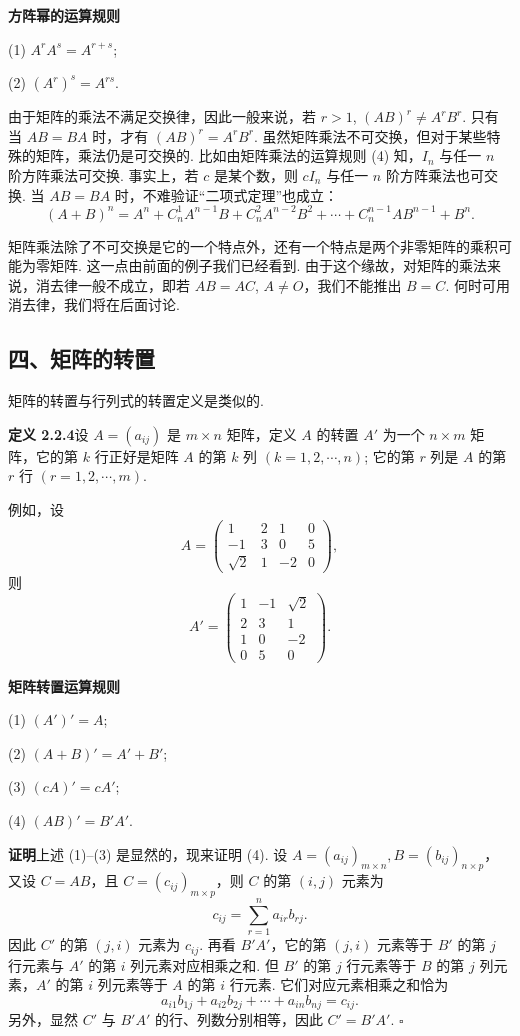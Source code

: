 \documentclass[UTF8, 12pt, fontset=fandol, oneside]{ctexart}
\begin{document}
\noindent\textbf{方阵幂的运算规则}

(1) $A^rA^s=A^{r+s}$;

(2) $(A^r)^s=A^{rs}$.

由于矩阵的乘法不满足交换律，因此一般来说，若 $r>1$, $(AB)^r\ne A^rB^r$. 只有当 $AB=BA$ 时，才有 $(AB)^r=A^rB^r$. 虽然矩阵乘法不可交换，但对于某些特殊的矩阵，乘法仍是可交换的. 比如由矩阵乘法的运算规则 (4) 知，$I_n$ 与任一 $n$ 阶方阵乘法可交换. 事实上，若 $c$ 是某个数，则 $cI_n$ 与任一 $n$ 阶方阵乘法也可交换. 当 $AB=BA$ 时，不难验证``二项式定理''也成立：
\[
(A+B)^n=A^n+C_n^1A^{n-1}B+C_n^2A^{n-2}B^2+\cdots+C_n^{n-1}AB^{n-1}+B^n.
\]

矩阵乘法除了不可交换是它的一个特点外，还有一个特点是两个非零矩阵的乘积可能为零矩阵. 这一点由前面的例子我们已经看到. 由于这个缘故，对矩阵的乘法来说，消去律一般不成立，即若 $AB=AC$, $A\ne O$，我们不能推出 $B=C$. 何时可用消去律，我们将在后面讨论.

\subsection*{四、矩阵的转置}

矩阵的转置与行列式的转置定义是类似的.

\noindent\textbf{定义 2.2.4}\quad 设 $A=(a_{ij})$ 是 $m\times n$ 矩阵，定义 $A$ 的转置 $A'$ 为一个 $n\times m$ 矩阵，它的第 $k$ 行正好是矩阵 $A$ 的第 $k$ 列 $(k=1,2,\cdots,n)$; 它的第 $r$ 列是 $A$ 的第 $r$ 行 $(r=1,2,\cdots,m)$.

例如，设
\[
A=\left(\begin{array}{cccc}
1 & 2 & 1 & 0\\
-1 & 3 & 0 & 5\\
\sqrt{2} & 1 & -2 & 0
\end{array}\right),
\]
则
\[
A'=\left(\begin{array}{ccc}
1 & -1 & \sqrt{2}\\
2 & 3 & 1\\
1 & 0 & -2\\
0 & 5 & 0
\end{array}\right).
\]

\noindent\textbf{矩阵转置运算规则}

(1) $(A')'=A$;

(2) $(A+B)'=A'+B'$;

(3) $(cA)'=cA'$;

(4) $(AB)'=B'A'$.

\noindent\textbf{证明}\quad 上述 (1)--(3) 是显然的，现来证明 (4). 设 $A=(a_{ij})_{m\times n}, B=(b_{ij})_{n\times p}$，又设 $C=AB$，且 $C=(c_{ij})_{m\times p}$，则 $C$ 的第 $(i,j)$ 元素为
\[
c_{ij}=\sum_{r=1}^{n}a_{ir}b_{rj}.
\]
因此 $C'$ 的第 $(j,i)$ 元素为 $c_{ij}$. 再看 $B'A'$，它的第 $(j,i)$ 元素等于 $B'$ 的第 $j$ 行元素与 $A'$ 的第 $i$ 列元素对应相乘之和. 但 $B'$ 的第 $j$ 行元素等于 $B$ 的第 $j$ 列元素，$A'$ 的第 $i$ 列元素等于 $A$ 的第 $i$ 行元素. 它们对应元素相乘之和恰为
\[
a_{i1}b_{1j}+a_{i2}b_{2j}+\cdots+a_{in}b_{nj}=c_{ij}.
\]
另外，显然 $C'$ 与 $B'A'$ 的行、列数分别相等，因此 $C'=B'A'$. $\square$
\end{document}
